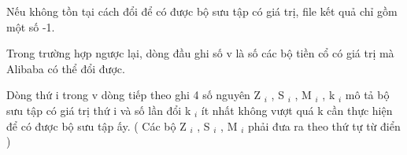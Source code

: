 Nếu không tồn tại cách đổi để có được bộ sưu tập có giá trị, file kết quả chỉ gồm một số -1.

Trong trường hợp ngược lại, dòng đầu ghi số v là số các bộ tiền cổ có giá trị mà Alibaba có thể đổi được.

Dòng thứ i trong v dòng tiếp theo ghi 4 số nguyên Z $_ i $ , S $_ i $ , M $_ i $ , k $_ i $ mô tả bộ sưu tập có giá trị thứ i và số lần đổi k $_ i $ ít nhất không vượt quá k cần thực hiện để có được bộ sưu tập ấy. ( Các bộ Z $_ i $ , S $_ i $ , M $_ i $ phải đưa ra theo thứ tự từ điển )